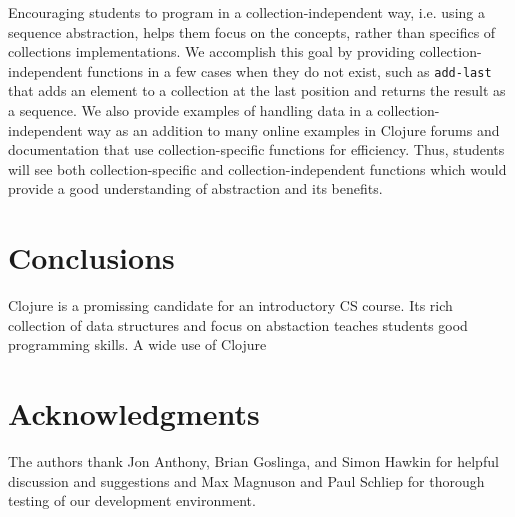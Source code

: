 \documentclass[submission,copyright,creativecommons]{eptcs}
\newcommand{\allcomments}[1]{{#1}}
\newcommand{\joecomment}[1]{{\bf \color{JoesGold}{\allcomments{{#1}}}}}
\newcommand{\todo}[1]{{\bf \color{magenta}{\allcomments{ To-do: {#1}}}}}
\begin{document}
Encouraging students to program in a collection-independent way, i.e. using a sequence abstraction, helps them focus on the concepts, rather than specifics of collections implementations. We accomplish this goal by providing collection-independent functions in a few cases when they do not exist, such as {\tt add-last} that adds an element to a collection at the last position and returns the result as a sequence. We also provide examples of handling data in a collection-independent way as an addition to many online examples in Clojure forums and documentation that use collection-specific functions for efficiency. Thus, students will see both collection-specific and collection-independent functions which would provide a good understanding of abstraction and its benefits. 



\section{Conclusions}
Clojure is a promissing candidate for an introductory CS course. Its rich collection of data structures and focus on abstaction teaches students good programming skills. A wide use of Clojure 

\section{Acknowledgments}
The authors thank Jon Anthony, Brian Goslinga, and Simon Hawkin for helpful discussion and suggestions and %
Max Magnuson and Paul Schliep for thorough testing of our development environment. 




\end{document}
